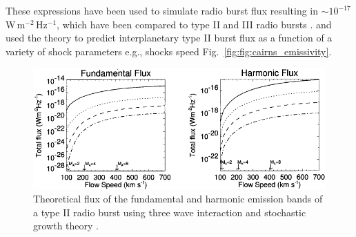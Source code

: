 These expressions have been used to simulate radio burst flux resulting in $\sim10^{-17}$\,W\,m$^{-2}$\,Hz$^{-1}$, which have been compared to type II and III radio bursts \citep{schmidt2012, knock2001}. \citet{knock2003} and \citet{cairns2003} used the theory to predict interplanetary type II burst flux as a function of a variety of shock parameters e.g., shocks speed Fig.~\ref{fig:fig:cairns_emissivity}.
\begin{figure}[t!]
\begin{center}
\includegraphics[scale=1.1]{images/Cairns2003.pdf}
\caption{Theoretical flux of the fundamental and harmonic emission bands of a type II radio burst using three wave interaction and stochastic growth theory \citet{cairns2003}.}
\label{fig:cairns_emissivity}
\end{center}
\end{figure}


